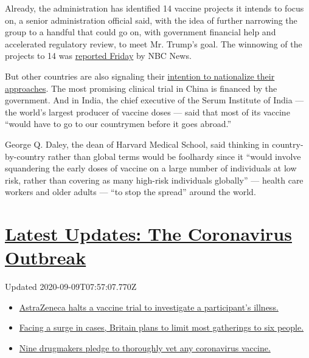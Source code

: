 Already, the administration has identified 14 vaccine projects it
intends to focus on, a senior administration official said, with the
idea of further narrowing the group to a handful that could go on, with
government financial help and accelerated regulatory review, to meet Mr.
Trump's goal. The winnowing of the projects to 14 was
\href{https://www.nbcnews.com/politics/white-house/health-officials-eyeing-least-one-14-potential-coronavirus-vaccines-fast-n1198326}{reported
Friday} by NBC News.

But other countries are also signaling their
\href{https://www.nytimes3xbfgragh.onion/2020/04/10/business/coronavirus-vaccine-nationalism.html}{intention
to nationalize their approaches}. The most promising clinical trial in
China is financed by the government. And in India, the chief executive
of the Serum Institute of India --- the world's largest producer of
vaccine doses --- said that most of its vaccine ``would have to go to
our countrymen before it goes abroad.''

George Q. Daley, the dean of Harvard Medical School, said thinking in
country-by-country rather than global terms would be foolhardy since it
``would involve squandering the early doses of vaccine on a large number
of individuals at low risk, rather than covering as many high-risk
individuals globally'' --- health care workers and older adults --- ``to
stop the spread'' around the world.

\hypertarget{latest-updates-the-coronavirus-outbreak}{%
\section{\texorpdfstring{\href{https://www.nytimes3xbfgragh.onion/2020/09/08/world/covid-19-coronavirus.html?action=click\&pgtype=Article\&state=default\&region=MAIN_CONTENT_1\&context=storylines_live_updates}{Latest
Updates: The Coronavirus
Outbreak}}{Latest Updates: The Coronavirus Outbreak}}\label{latest-updates-the-coronavirus-outbreak}}

Updated 2020-09-09T07:57:07.770Z

\begin{itemize}
\tightlist
\item
  \href{https://www.nytimes3xbfgragh.onion/2020/09/08/world/covid-19-coronavirus.html?action=click\&pgtype=Article\&state=default\&region=MAIN_CONTENT_1\&context=storylines_live_updates\#link-313b443d}{AstraZeneca
  halts a vaccine trial to investigate a participant's illness.}
\item
  \href{https://www.nytimes3xbfgragh.onion/2020/09/08/world/covid-19-coronavirus.html?action=click\&pgtype=Article\&state=default\&region=MAIN_CONTENT_1\&context=storylines_live_updates\#link-4438dd7}{Facing
  a surge in cases, Britain plans to limit most gatherings to six
  people.}
\item
  \href{https://www.nytimes3xbfgragh.onion/2020/09/08/world/covid-19-coronavirus.html?action=click\&pgtype=Article\&state=default\&region=MAIN_CONTENT_1\&context=storylines_live_updates\#link-679303d7}{Nine
  drugmakers pledge to thoroughly vet any coronavirus vaccine.}
\end{itemize}

